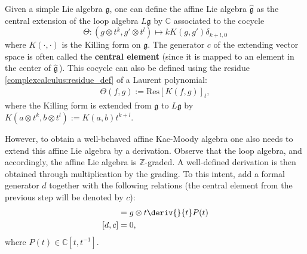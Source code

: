     \begin{definition}
        Given a simple Lie algebra $\mathfrak{g}$, one can define the affine Lie algebra $\widehat{\mathfrak{g}}$ as the central extension of the loop algebra $L\mathfrak{g}$ by $\mathbb{C}$ associated to the cocycle \[\Theta:(g\otimes t^k,g'\otimes t^l)\mapsto kK(g,g')\delta_{k+l,0}\] where $K(\cdot,\cdot)$ is the Killing form on $\mathfrak{g}$. The generator $c$ of the extending vector space is often called the \textbf{central element} (since it is mapped to an element in the center of $\widehat{\mathfrak{g}}$\,). This cocycle can also be defined using the residue \ref{complexcalculus:residue_def} of a Laurent polynomial:
        \begin{gather}
            \Theta(f,g) := \text{Res}\left[K(f,g)\right]_t,
        \end{gather}
        where the Killing form is extended from $\mathfrak{g}$ to $L\mathfrak{g}$ by $K(a\otimes t^k,b\otimes t^l):=K(a,b)t^{k+l}$.

        However, to obtain a well-behaved affine Kac-Moody algebra one also needs to extend this affine Lie algebra by a derivation. Observe that the loop algebra, and accordingly, the affine Lie algebra is $\mathbb{Z}$-graded. A well-defined derivation is then obtained through multiplication by the grading. To this intent, add a formal generator $d$ together with the following relations (the central element from the previous step will be denoted by $c$):
        \begin{align}
            [d,g\otimes P(t)] &= g\otimes t\deriv{}{t}P(t)\\
            [d,c] &= 0,
        \end{align}
        where $P(t)\in\mathbb{C}[t,t^{-1}]$.
    \end{definition}



